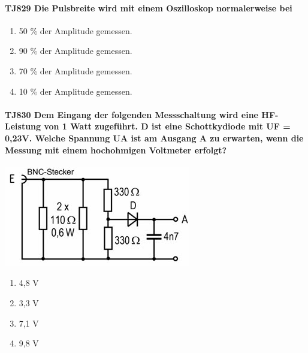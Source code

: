 \documentclass[8pt]{article}
\begin{document}
\paragraph*{TJ829 Die Pulsbreite wird mit einem Oszilloskop normalerweise bei} 
\begin{enumerate}[nolistsep,label=\Alph*]
\item 50 \% der Amplitude gemessen.
\item 90 \% der Amplitude gemessen.
\item 70 \% der Amplitude gemessen.
\item 10 \% der Amplitude gemessen.
\end{enumerate}

\paragraph*{TJ830 Dem Eingang der folgenden Messschaltung wird eine HF-Leistung von 1 Watt zugeführt. D ist eine Schottkydiode mit UF = 0,23V. Welche Spannung UA ist am Ausgang A zu erwarten, wenn die Messung mit einem hochohmigen Voltmeter erfolgt?}
\begin{center}
	\begin{minipage}{\linewidth}
		\centering
		\includegraphics[scale=1.0]{pics/tj830_a.jpg}
	\end{minipage}
\end{center}
\begin{enumerate}[nolistsep,label=\Alph*]
\item 4,8 V
\item 3,3 V
\item 7,1 V
\item 9,8 V
\end{enumerate}
\end{document}
